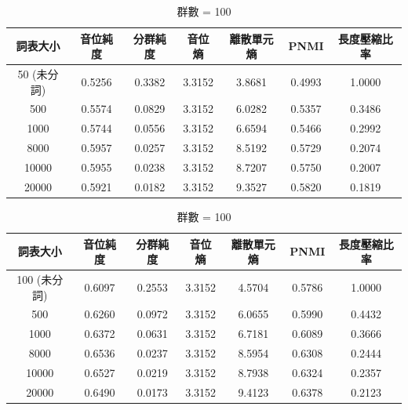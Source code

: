 {{{
\begin{table}[!htbp]
    \centering
    \begin{subtable}[t]{\textwidth}
        \centering
        \begin{tabular}{|c|c|c|c|c|c|c|} \hline 
                詞表大小  & 音位純度 & 分群純度 & 音位熵 & 離散單元熵 &    PNMI & 長度壓縮比率 \\ \hline 
50 (未分詞)& 0.5256& 0.3382& 3.3152& 3.8681& 0.4993&1.0000\\ \hline 
                   500  &   0.5574   &  0.0829 &   3.3152  &  6.0282 & 0.5357 & 0.3486  \\ \hline %
                  1000  &   0.5744   &  0.0556 &   3.3152  &  6.6594 & 0.5466 & 0.2992  \\ \hline %
                  8000  &   0.5957   &  0.0257 &   3.3152  &  8.5192 & 0.5729 & 0.2074  \\ \hline %
                 10000  &   0.5955   &  0.0238 &   3.3152  &  8.7207 & 0.5750 & 0.2007  \\ \hline %
                 20000  &   0.5921   &  0.0182 &   3.3152  &  9.3527 & 0.5820 & 0.1819  \\ \hline %
        \end{tabular}
\caption{群數 = 50}
        \label{tab:ch4-hubert-phn-clu050}
    \end{subtable}        
    \jefftablesep        
    \begin{subtable}[t]{\textwidth}
        \centering
        \begin{tabular}{|c|c|c|c|c|c|c|} \hline 
                詞表大小  & 音位純度 & 分群純度 & 音位熵 & 離散單元熵 &    PNMI & 長度壓縮比率 \\ \hline 
100 (未分詞)& 0.6097& 0.2553& 3.3152& 4.5704& 0.5786&1.0000\\ \hline 
                   500  &   0.6260   &  0.0972 &   3.3152  &  6.0655 & 0.5990 & 0.4432  \\ \hline %
                  1000  &   0.6372   &  0.0631 &   3.3152  &  6.7181 & 0.6089 & 0.3666  \\ \hline %
                  8000  &   0.6536   &  0.0237 &   3.3152  &  8.5954 & 0.6308 & 0.2444  \\ \hline %
                 10000  &   0.6527   &  0.0219 &   3.3152  &  8.7938 & 0.6324 & 0.2357  \\ \hline %
                 20000  &   0.6490   &  0.0173 &   3.3152  &  9.4123 & 0.6378 & 0.2123  \\ \hline %
        \end{tabular}
\caption{群數 = 100}
        \label{tab:ch4-hubert-phn-clu100}
    \end{subtable}        



\end{table}}}}
